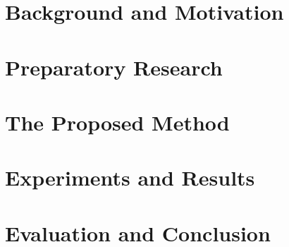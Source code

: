 \documentclass[b5paper, twoside, titlepage, 10pt]{report}
\begin{document}
\chapter{Background and Motivation}
\label{backgroundAndMotivation}

%





\chapter{Preparatory Research}
\label{relatedWork}





\chapter{The Proposed Method}
\label{theModel}











%

\chapter{Experiments and Results}
\label{experimentsAndResults}








\chapter{Evaluation and Conclusion}
\label{evaluationAndConclusion}






\cleardoublepage





\clearpage

\begin{appendices}



\end{appendices}
\end{document}
